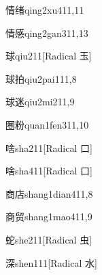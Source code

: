 \begin{verbete}{情绪}{qing2xu4}{11,11}
\end{verbete}

\begin{verbete}{情感}{qing2gan3}{11,13}
\end{verbete}

\begin{verbete}{球}{qiu2}{11}[Radical 玉]
\end{verbete}

\begin{verbete}{球拍}{qiu2pai1}{11,8}
\end{verbete}

\begin{verbete}{球迷}{qiu2mi2}{11,9}
\end{verbete}

\begin{verbete}{圈粉}{quan1fen3}{11,10}
\end{verbete}

\begin{verbete}{啥}{sha2}{11}[Radical 口]
\end{verbete}

\begin{verbete}{啥}{sha4}{11}[Radical 口]
\end{verbete}

\begin{verbete}{商店}{shang1dian4}{11,8}
\end{verbete}

\begin{verbete}{商贸}{shang1mao4}{11,9}
\end{verbete}

\begin{verbete}{蛇}{she2}{11}[Radical 虫]
\end{verbete}

\begin{verbete}{深}{shen1}{11}[Radical 水]
\end{verbete}

